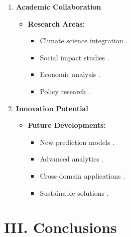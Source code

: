 \documentclass[a4paper]{report}
\begin{document}
\begin{enumerate}
    \item \textbf{Academic Collaboration}
    \begin{itemize}
        \item \textbf{Research Areas:}
        \begin{itemize}
            \item Climate science integration \cite{foster2024}.
            \item Social impact studies \cite{williams2023}.
            \item Economic analysis \cite{smith2023}.
            \item Policy research \cite{roberts2023}.
        \end{itemize}
    \end{itemize}

    \item \textbf{Innovation Potential}
    \begin{itemize}
        \item \textbf{Future Developments:}
        \begin{itemize}
            \item New prediction models \cite{clark2023}.
            \item Advanced analytics \cite{taylor2023}.
            \item Cross-domain applications \cite{brown2023}.
            \item Sustainable solutions \cite{martin2024}.
        \end{itemize}
    \end{itemize}
\end{enumerate}

\section*{III. Conclusions}
\end{document}
